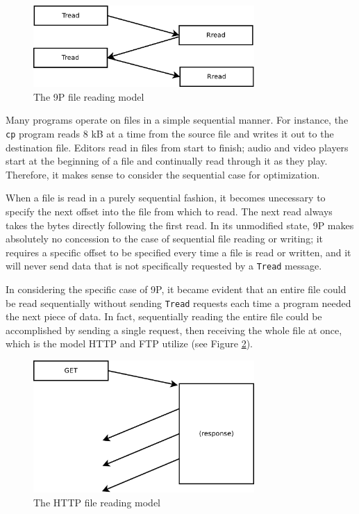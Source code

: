 \documentclass[11pt,american]{report}
\begin{document}
\begin{figure}[h]
	\begin{center}
		\includegraphics[width=0.75\textwidth]{9P-read.pdf}
	\end{center}
	\caption{The 9P file reading model}
	\label{figure:9pmodel}
\end{figure}

Many programs operate on files in a simple sequential manner. For instance, the {\tt cp} program reads 8 kB at a time from the source file and writes it out to the destination file. Editors read in files from start to finish; audio and video players start at the beginning of a file and continually read through it as they play. Therefore, it makes sense to consider the sequential case for optimization.

When a file is read in a purely sequential fashion, it becomes unecessary to specify the next offset into the file from which to read. The next read always takes the bytes directly following the first read. In its unmodified state, 9P makes absolutely no concession to the case of sequential file reading or writing; it requires a specific offset to be specified every time a file is read or written, and it will never send data that is not specifically requested by a {\tt Tread} message.

In considering the specific case of 9P, it became evident that an entire file could be read sequentially without sending {\tt Tread} requests each time a program needed the next piece of data. In fact, sequentially reading the entire file could be accomplished by sending a single request, then receiving the whole file at once, which is the model HTTP and FTP utilize (see Figure \ref{figure:httpmodel}).

\begin{figure}[h]
	\begin{center}
		\includegraphics[width=0.75\textwidth]{HTTP-get.pdf}
	\end{center}
	\caption{The HTTP file reading model}
	\label{figure:httpmodel}
\end{figure}
\end{document}
